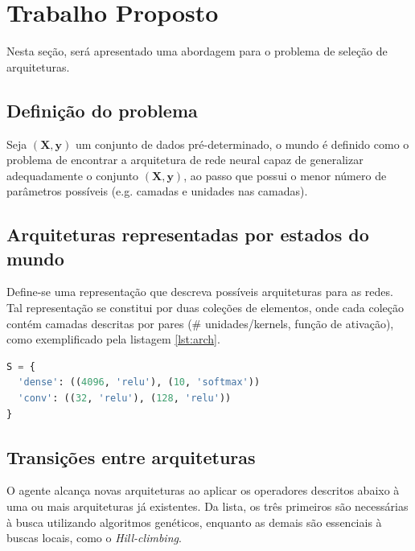 \documentclass[twoside,conference,a4paper,12px]{IEEEtran}
\begin{document}
\section{Trabalho Proposto}
\label{sec:trabalhoproposto}

Nesta seção, será apresentado uma abordagem para o problema de seleção de arquiteturas.

\subsection{Definição do problema}

Seja $(\bm{X, y})$ um conjunto de dados pré-determinado, o mundo é definido como o problema de encontrar a arquitetura de rede neural capaz de generalizar adequadamente o conjunto $(\bm{X, y})$, ao passo que possui o menor número de parâmetros possíveis (e.g. camadas e unidades nas camadas).

\subsection{Arquiteturas representadas por estados do mundo}

Define-se uma representação que descreva possíveis arquiteturas para as redes. Tal representação se constitui por duas coleções de elementos, onde cada coleção contém camadas descritas por pares (\# unidades/kernels, função de ativação), como exemplificado pela listagem \ref{lst:arch}.

\begin{lstlisting}[language=Python, caption={Representação de uma arquitetura de rede neural artificial como um estado no espaço de busca.}, label={lst:arch}]
S = {
  'dense': ((4096, 'relu'), (10, 'softmax'))
  'conv': ((32, 'relu'), (128, 'relu'))
}
\end{lstlisting}

\subsection{Transições entre arquiteturas}

O agente alcança novas arquiteturas ao aplicar os operadores descritos abaixo à uma ou mais arquiteturas já existentes. Da lista, os três primeiros são necessárias à busca utilizando algoritmos genéticos, enquanto as demais são essenciais à buscas locais, como o \textit{Hill-climbing}.
\end{document}
